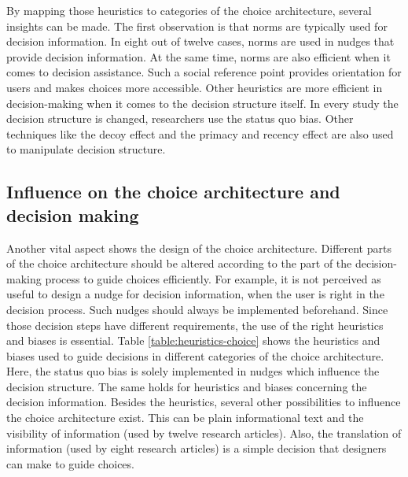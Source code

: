 By mapping those heuristics to categories of the choice architecture, several insights can be made. The first observation is that norms are typically used for decision information. In eight out of twelve cases, norms are used in nudges that provide decision information. At the same time, norms are also efficient when it comes to decision assistance. Such a social reference point provides orientation for users and makes choices more accessible. 
Other heuristics are more efficient in decision-making when it comes to the decision structure itself. In every study the decision structure is changed, researchers use the status quo bias.
Other techniques like the decoy effect and the primacy and recency effect are also used to manipulate decision structure.



\subsection{Influence on the choice architecture and decision making}


Another vital aspect shows the design of the choice architecture. Different parts of the choice architecture should be altered according to the part of the decision-making process to guide choices efficiently. For example, it is not perceived as useful to design a nudge for decision information, when the user is right in the decision process. Such nudges should always be implemented beforehand. Since those decision steps have different requirements, the use of the right heuristics and biases is essential. Table \ref{table:heuristics-choice} shows the heuristics and biases used to guide decisions in different categories of the choice architecture. Here, the status quo bias is solely implemented in nudges which influence the decision structure. The same holds for heuristics and biases concerning the decision information. Besides the heuristics, several other possibilities to influence the choice architecture exist. This can be plain informational text and the visibility of information (used by twelve research articles). Also, the translation of information (used by eight research articles) is a simple decision that designers can make to guide choices. 

